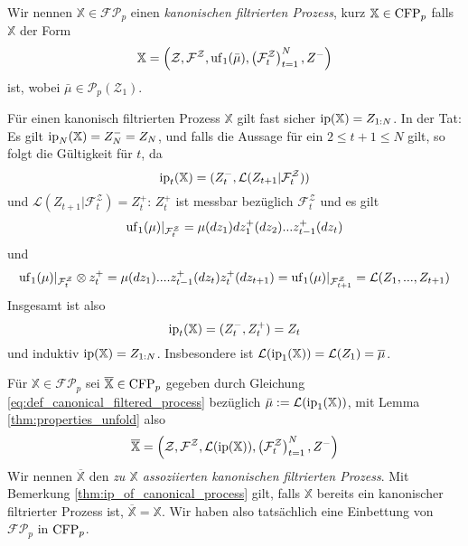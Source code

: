 \begin{definition}
    Wir nennen $\mathbb{X} \in \mathcal{FP}_p$ einen \emph{kanonischen filtrierten Prozess}, kurz $\mathbb{X} \in \operatorname{CFP}_p$ falls $\mathbb{X}$ der Form
    \begin{equation}\label{eq:def_canonical_filtered_process}
    \mathbb{X} = \left( \mathcal{Z}, \mathcal{F}^\mathcal{Z}, \operatorname{uf}_1(\bar{\mu}), \left(\mathcal{F}_t^\mathcal{Z}\right)_{t=1}^N, Z^-\right)
    \end{equation}
    ist, wobei $\bar{\mu} \in \mathcal{P}_p(\mathcal{Z}_1)$.
\end{definition}
\begin{remark}\label{thm:ip_of_canonical_process}
    Für einen kanonisch filtrierten Prozess $\mathbb{X}$ gilt fast sicher $\operatorname{ip}(\mathbb{X}) = Z_{1:N}$. In der Tat: Es gilt $\operatorname{ip}_N(\mathbb{X}) = Z_N^- = Z_N$, und falls die Aussage für ein $2\leq t+1 \leq N$ gilt, so folgt die Gültigkeit für $t$, da 
    $$\operatorname{ip}_t(\mathbb{X}) = (Z_t^-, \mathcal{L}(Z_{t+1} \vert \mathcal{F}_t^\mathcal{Z}))$$
    und $\mathcal{L}(Z_{t+1} \vert \mathcal{F}_t^\mathcal{Z}) = Z_t^+$: $Z_t^+$ ist messbar bezüglich $\mathcal{F}_t^\mathcal{Z}$ und es gilt 
    $$\operatorname{uf}_1(\mu) \vert_{\mathcal{F}_t^\mathcal{Z}} = \mu(dz_1)dz_1^+(dz_2)...z_{t-1}^+(dz_t)$$
    und 
    $$\operatorname{uf}_1(\mu) \vert_{\mathcal{F}_t^\mathcal{Z}} \otimes z_t^+ = \mu(dz_1)....z_{t-1}^+(dz_t)z_t^+(dz_{t+1}) = \operatorname{uf}_1(\mu)\vert_{\mathcal{F}_{t+1}^\mathcal{Z}} = \mathcal{L}(Z_1,...,Z_{t+1})$$
    Insgesamt ist also 
    $$\operatorname{ip}_t(\mathbb{X}) = (Z_t^-, Z_t^+) = Z_t$$
    und induktiv $\operatorname{ip}(\mathbb{X}) = Z_{1:N}$.
    Insbesondere ist $\mathcal{L}(\operatorname{ip}_1(\mathbb{X})) = \mathcal{L}(Z_1) = \overline{\mu}$.
\end{remark}
\begin{definition}
    Für $\mathbb{X} \in \mathcal{FP}_p$ sei $\overline{\mathbb{X}} \in \operatorname{CFP}_p$ gegeben durch Gleichung \ref{eq:def_canonical_filtered_process} bezüglich $\bar\mu := \mathcal{L}(\operatorname{ip}_1(\mathbb{X}))$, mit Lemma \ref{thm:properties_unfold} also
    \begin{equation}\label{eq:associated_process}
        \overline{\mathbb{X}} = \left( \mathcal{Z}, \mathcal{F}^\mathcal{Z}, \mathcal{L}(\operatorname{ip}(\mathbb{X})), \left(\mathcal{F}_t^\mathcal{Z}\right)_{t=1}^N, Z^-\right)
    \end{equation}
    Wir nennen $\overline{\mathbb{X}}$ den \emph{zu $\mathbb{X}$ assoziierten kanonischen filtrierten Prozess}. Mit Bemerkung \ref{thm:ip_of_canonical_process} gilt, falls $\mathbb{X}$ bereits ein kanonischer filtrierter Prozess ist, $\overline{\mathbb{X}} = \mathbb{X}$. Wir haben also tatsächlich eine Einbettung von $\mathcal{FP}_p$ in $\operatorname{CFP}_p$.
\end{definition}
